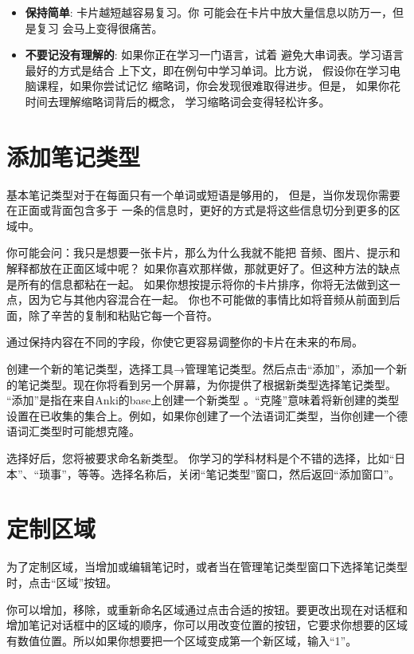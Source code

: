 \documentclass[a4paper]{book}
\begin{document}
	\begin{itemize}
		\itemsep1pt\parskip0pt
		\item \textbf{保持简单}: 卡片越短越容易复习。你 可能会在卡片中放大量信息以防万一，但是复习 会马上变得很痛苦。
		\item \textbf{不要记没有理解的}: 如果你正在学习一门语言，试着 避免大串词表。学习语言最好的方式是结合 上下文，即在例句中学习单词。比方说， 假设你在学习电脑课程，如果你尝试记忆 缩略词，你会发现很难取得进步。但是， 如果你花时间去理解缩略词背后的概念， 学习缩略词会变得轻松许多。
	\end{itemize}
	
	\section{添加笔记类型}
	
	基本笔记类型对于在每面只有一个单词或短语是够用的， 但是，当你发现你需要在正面或背面包含多于 一条的信息时，更好的方式是将这些信息切分到更多的区域中。
	
	你可能会问：我只是想要一张卡片，那么为什么我就不能把 音频、图片、提示和解释都放在正面区域中呢？ 如果你喜欢那样做，那就更好了。但这种方法的缺点是所有的信息都粘在一起。 如果你想按提示将你的卡片排序，你将无法做到这一点，因为它与其他内容混合在一起。 你也不可能做的事情比如将音频从前面到后面，除了辛苦的复制和粘贴它每一个音符。
	
	通过保持内容在不同的字段，你使它更容易调整你的卡片在未来的布局。
	
	创建一个新的笔记类型，选择工具→管理笔记类型。然后点击“添加”，添加一个新的笔记类型。现在你将看到另一个屏幕，为你提供了根据新类型选择笔记类型。 “添加”是指在来自Anki的base上创建一个新类型 。“克隆”意味着将新创建的类型设置在已收集的集合上。例如，如果你创建了一个法语词汇类型，当你创建一个德语词汇类型时可能想克隆。
	
	选择好后，您将被要求命名新类型。 你学习的学科材料是个不错的选择，比如“日本”、“琐事”，等等。选择名称后，关闭“笔记类型”窗口，然后返回“添加窗口”。
	
	\section{定制区域}\label{fields}
	
	为了定制区域，当增加或编辑笔记时，或者当在管理笔记类型窗口下选择笔记类型时，点击“区域”按钮。
	
	你可以增加，移除，或重新命名区域通过点击合适的按钮。要更改出现在对话框和增加笔记对话框中的区域的顺序，你可以用改变位置的按钮，它要求你想要的区域有数值位置。所以如果你想要把一个区域变成第一个新区域，输入“1”。
	
\end{document}
